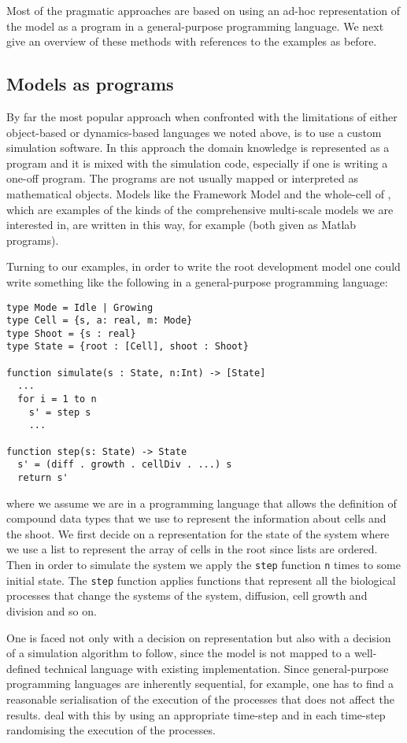 Most of the pragmatic approaches are based on using an ad-hoc representation of
the model as a program in a general-purpose programming language. We next give
an overview of these methods with references to the examples as before.


\subsection{Models as programs}
By far the most popular approach when confronted with the limitations of either
object-based or dynamics-based languages we noted above, is to use a custom
simulation software. In this approach the domain knowledge is represented as a
program and it is mixed with the simulation code, especially if one is writing a
one-off program. The programs are not usually mapped or interpreted as
mathematical objects. Models like the Framework Model \citep{chew2014multiscale}
and the whole-cell of \citet{karr_whole-cell_2012}, which are examples of the
kinds of the comprehensive multi-scale models we are interested in, are written
in this way, for example (both given as Matlab programs).

Turning to our examples, in order to write the root development model one could
write something like the following in a general-purpose programming language:

\begin{BVerbatim}
type Mode = Idle | Growing
type Cell = {s, a: real, m: Mode}
type Shoot = {s : real}
type State = {root : [Cell], shoot : Shoot}

function simulate(s : State, n:Int) -> [State]
  ...
  for i = 1 to n
    s' = step s
    ...

function step(s: State) -> State
  s' = (diff . growth . cellDiv . ...) s
  return s'
\end{BVerbatim}

where we assume we are in a programming language that allows the definition of
compound data types that we use to represent the information about cells and the
shoot. We first decide on a representation for the state of the system where we
use a list to represent the array of cells in the root since lists are
ordered. Then in order to simulate the system we apply the \texttt{step}
function \texttt{n} times to some initial state. The \texttt{step} function
applies functions that represent all the biological processes that change the
systems of the system, diffusion, cell growth and division and so on.

One is faced not only with a decision on representation but also with a decision
of a simulation algorithm to follow, since the model is not mapped to a
well-defined technical language with existing implementation. Since
general-purpose programming languages are inherently sequential, for example,
one has to find a reasonable serialisation of the execution of the processes
that does not affect the results. \citet{karr_whole-cell_2012} deal with this by
using an appropriate time-step and in each time-step randomising the execution
of the processes.

